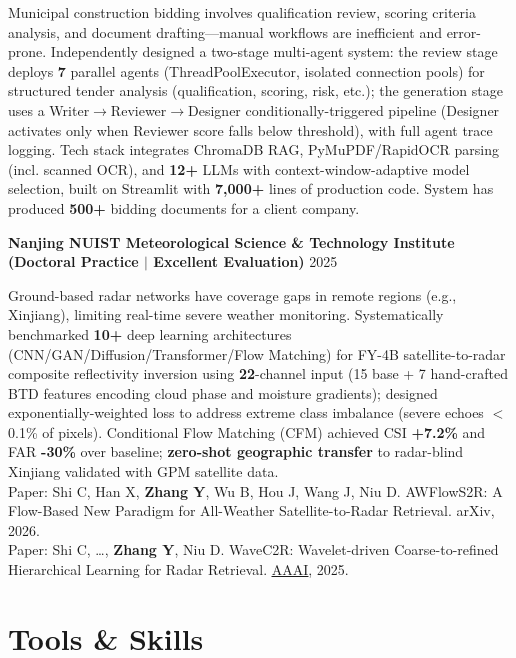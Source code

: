 \documentclass[10pt,a4paper]{article}
\let\oldhref\href
\renewcommand{\href}[2]{\oldhref{#1}{\underline{#2}}}
\newcommand{\project}[3]{%
  \vspace{1pt}
  {\textbf{#1}} {\textbf{(#3)}} \hfill {\color{lightgray}#2}\par\vspace{0pt}
}
\begin{document}
Municipal construction bidding involves qualification review, scoring criteria analysis, and document drafting---manual workflows are inefficient and error-prone. Independently designed a two-stage multi-agent system: the review stage deploys \textbf{7} parallel agents (ThreadPoolExecutor, isolated connection pools) for structured tender analysis (qualification, scoring, risk, etc.); the generation stage uses a Writer$\to$Reviewer$\to$Designer conditionally-triggered pipeline (Designer activates only when Reviewer score falls below threshold), with full agent trace logging. Tech stack integrates ChromaDB RAG, PyMuPDF/RapidOCR parsing (incl. scanned OCR), and \textbf{12+} LLMs with context-window-adaptive model selection, built on Streamlit with \textbf{7,000+} lines of production code. System has produced \textbf{500+} bidding documents for a client company.\par

\vspace{12pt}
\project{Nanjing NUIST Meteorological Science \& Technology Institute}{2025}
{Doctoral Practice $|$ Excellent Evaluation}

Ground-based radar networks have coverage gaps in remote regions (e.g., Xinjiang), limiting real-time severe weather monitoring. Systematically benchmarked \textbf{10+} deep learning architectures (CNN/GAN/Diffusion/Transformer/Flow Matching) for FY-4B satellite-to-radar composite reflectivity inversion using \textbf{22}-channel input (15 base + 7 hand-crafted BTD features encoding cloud phase and moisture gradients); designed exponentially-weighted loss to address extreme class imbalance (severe echoes $<$0.1\% of pixels). Conditional Flow Matching (CFM) achieved CSI \textbf{+7.2\%} and FAR \textbf{-30\%} over baseline; \textbf{zero-shot geographic transfer} to radar-blind Xinjiang validated with GPM satellite data.\\[2pt]
{Paper: Shi C, Han X, \textbf{Zhang Y}, Wu B, Hou J, Wang J, Niu D. AWFlowS2R: A Flow-Based New Paradigm for All-Weather Satellite-to-Radar Retrieval. arXiv, 2026.\\
Paper: Shi C, \ldots, \textbf{Zhang Y}, Niu D. WaveC2R: Wavelet-driven Coarse-to-refined Hierarchical Learning for Radar Retrieval. \href{https://arxiv.org/abs/2511.17558}{AAAI}, 2025.}\par

\section{Tools \& Skills}
\end{document}
